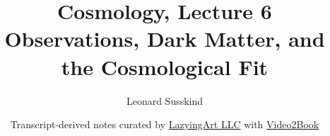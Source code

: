 \documentclass[11pt,oneside]{book}
\begin{document}
\hypersetup{pageanchor=false}
\frontmatter
\title{Cosmology, Lecture 6\\Observations, Dark Matter, and the Cosmological Fit}
\author{Leonard Susskind}
\date{Transcript-derived notes curated by \href{https://lazying.art}{LazyingArt LLC} with \href{https://github.com/lachlanchen/Video2Book}{Video2Book}}
\maketitle
\hypersetup{pageanchor=true}
\mainmatter

\end{document}
